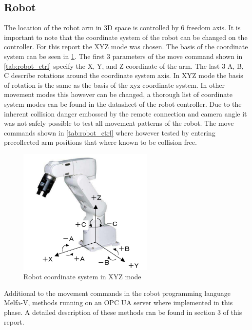 \documentclass{article}
\begin{document}
\subsection{Robot}
The location of the robot arm in 3D space is controlled by 6 freedom axis. It is important to note that the coordinate system of the robot can be changed on the controller. For this report the XYZ mode was chosen. The basis of the coordinate system can be seen in \ref{fig:robot_axis}. The first 3 parameters of the move command shown in \ref{tab:robot_ctrl} specify the X, Y, and Z coordinate of the arm. The last 3 A, B, C describe rotations around the coordinate system axis. In XYZ mode the basis of rotation is the same as the basis of the xyz coordinate system. In other movement modes this however can be changed, a thorough list of coordinate system modes can be found in the datasheet of the robot controller.\newline
Due to the inherent collision danger embossed by the remote connection and camera angle it was not safely possible to test all movement patterns of the robot. The move commands shown in \ref{tab:robot_ctrl} where however tested by entering precollected arm positions that where known to be collision free.
\begin{figure}[htp]
	\centering
	\includegraphics[width=0.6\textwidth]{images/robot_axis.png}
	\caption{Robot coordinate system in XYZ mode}
	\label{fig:robot_axis}
\end{figure}
\par Additional to the movement commands in the robot programming language Melfa-V, methods running on an OPC UA server where implemented in this phase. A detailed description of these methods can be found in section 3 of this report.
\end{document}
